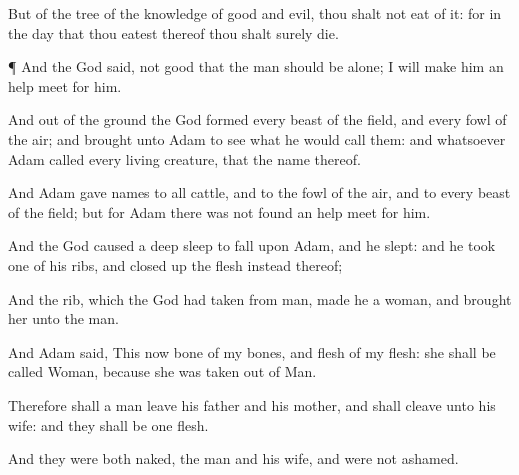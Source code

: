 {But of the
tree of the
knowledge of
good and
evil, thou shalt not
eat of it: for in the
day that thou
eatest thereof thou shalt
surely
die.


\par }{\PP {}¶ And the
{}
God
said,
{} not
good that the
man should
be alone; I will
make him an help
meet for him.

And out of the
ground the
{}
God
formed every
beast of the
field, and every
fowl of the
air; and
brought
{} unto
Adam to
see what he would
call them: and whatsoever
Adam
called every
living
creature,
that
{} the name
thereof.

And
Adam
gave
names to all
cattle, and to the
fowl of the
air, and to every
beast of the
field; but for
Adam there was not
found an help
meet for him.


\par }{\PP {}And the
{}
God
caused a deep
sleep to
fall upon
Adam, and he
slept: and he
took
one of his
ribs, and closed
up the
flesh instead thereof;

And the
rib, which the
{}
God had
taken from
man,
made he a
woman, and
brought her unto the
man.

And
Adam
said,
This
{}
now
bone of my
bones, and
flesh of my
flesh:
she shall be
called
Woman, because
she was
taken out of
Man.

Therefore shall a
man
leave his
father and his
mother, and shall
cleave unto his
wife: and they shall be
one
flesh.

And they were
both
naked, the
man and his
wife, and were not
ashamed.




\par }
